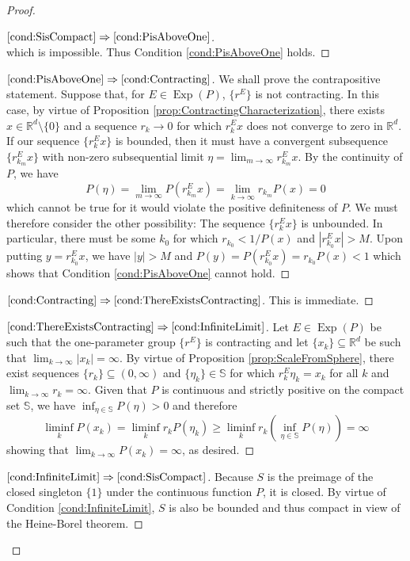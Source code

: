 \documentclass[11pt, letter]{book}
\newcommand*{\myproofname}{Proof}
\newenvironment{subproof}[1][\myproofname]{\begin{proof}[#1]\renewcommand*{\qedsymbol}{$\mathbin{/\mkern-6mu/}$}}{\end{proof}}
\newcommand\Exp{\operatorname{Exp}}
\begin{document}
\begin{proof}
\begin{subproof}[$\ref{cond:SisCompact}\Rightarrow\ref{cond:PisAboveOne}$]
\begin{equation*}
\end{equation*}
which is impossible. Thus Condition \ref{cond:PisAboveOne} holds.
\end{subproof}
\begin{subproof}[$\ref{cond:PisAboveOne}\Rightarrow\ref{cond:Contracting}$]
We shall prove the contrapositive statement. Suppose that, for $E\in\Exp(P)$, $\{r^E\}$ is not contracting. In this case, by virtue of Proposition \ref{prop:ContractingCharacterization}, there exists $x\in\mathbb{R}^d\setminus\{0\}$ and a sequence $r_k\to 0$ for which $r_k^Ex$ does not converge to zero in $\mathbb{R}^d$. If our sequence $\{r_k^Ex\}$ is bounded, then it must have a convergent subsequence $\{r_{k_m}^Ex\}$ with non-zero subsequential limit $\eta=\lim_{m\to\infty}r_{k_m}^Ex$. By the continuity of $P$, we have
\begin{equation*}
P(\eta)=\lim_{m\to\infty}P(r_{k_m}^Ex)=\lim_{k\to\infty}r_{k_m}P(x)=0
\end{equation*}
which cannot be true for it would violate the positive definiteness of $P$. We must therefore consider the other possibility: The sequence $\{r_k^Ex\}$ is unbounded. In particular, there must be some $k_0$ for which $r_{k_0}<1/P(x)$ and $|r_{k_0}^Ex|>M$. Upon putting $y=r_{k_0}^Ex$, we have $|y|>M$ and  $P(y)=P(r_{k_0}^Ex)=r_{k_0}P(x)<1$ which shows that Condition \ref{cond:PisAboveOne} cannot hold.
\end{subproof}
\begin{subproof}[$\ref{cond:Contracting}\Rightarrow\ref{cond:ThereExistsContracting}$] This is immediate.
\end{subproof}
\begin{subproof}[$\ref{cond:ThereExistsContracting}\Rightarrow\ref{cond:InfiniteLimit}$]
Let $E\in\Exp(P)$ be such that the one-parameter group $\{r^E\}$ is contracting and let $\{x_k\}\subseteq\mathbb{R}^d$ be such that $\lim_{k\to\infty}|x_k|=\infty$. By virtue of Proposition \ref{prop:ScaleFromSphere}, there exist sequences $\{r_k\}\subseteq (0,\infty)$ and $\{\eta_k\}\in\mathbb{S}$ for which $r_k^E\eta_k=x_k$ for all $k$ and $\lim_{k\to\infty}r_k=\infty$. Given that $P$ is continuous and strictly positive on the compact set $\mathbb{S}$, we have $\inf_{\eta\in\mathbb{S}}P(\eta)>0$ and therefore
\begin{equation*}
\liminf_k P(x_k)=\liminf_k r_kP(\eta_k)\geq \liminf_k r_k\left(\inf_{\eta\in\mathbb{S}}P(\eta)\right)=\infty
\end{equation*}
showing that $\lim_{k\to\infty} P(x_k)=\infty$, as desired.
\end{subproof}
\begin{subproof}[$\ref{cond:InfiniteLimit}\Rightarrow\ref{cond:SisCompact}$]
Because $S$ is the preimage of the closed singleton $\{1\}$ under the continuous function $P$, it is closed. By virtue of Condition \ref{cond:InfiniteLimit}, $S$ is also be bounded and thus compact in view of the Heine-Borel theorem.
\end{subproof}
\end{proof}
\end{document}
